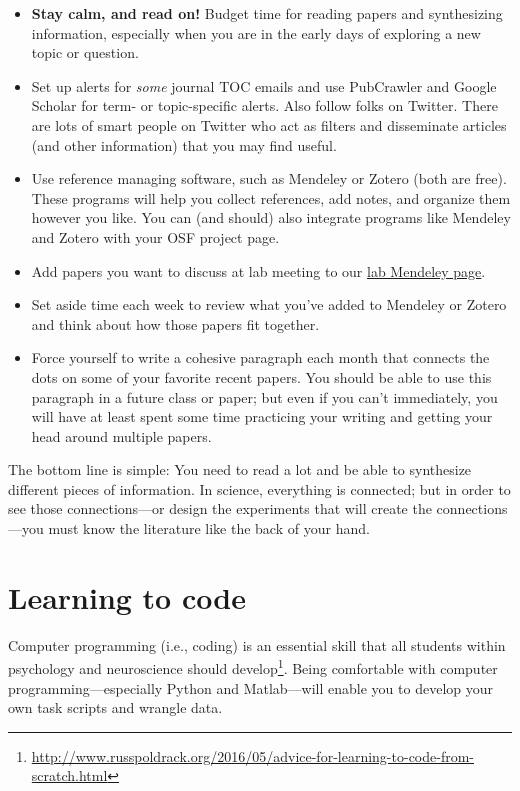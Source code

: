 \documentclass[letterpaper,12pt,oneside]{memoir}
\begin{document}
\begin{itemize}
\item \textbf{Stay calm, and read on!} Budget time for reading papers and synthesizing information, especially when you are in the early days of exploring a new topic or question. 
\item Set up alerts for \textit{some} journal TOC emails and use PubCrawler and Google Scholar for term- or topic-specific alerts. Also follow folks on Twitter. There are lots of smart people on Twitter who act as filters and disseminate articles (and other information) that you may find useful.
\item Use reference managing software, such as Mendeley or Zotero (both are free). These programs will help you collect references, add notes, and organize them however you like. You can (and should) also integrate programs like Mendeley and Zotero with your OSF project page.
\item Add papers you want to discuss at lab meeting to our \href{https://www.mendeley.com/community/smith-lab-meetings/}{lab Mendeley page}. 
\item Set aside time each week to review what you've added to Mendeley or Zotero and think about how those papers fit together.
\item Force yourself to write a cohesive paragraph each month that connects the dots on some of your favorite recent papers. You should be able to use this paragraph in a future class or paper; but even if you can't immediately, you will have at least spent some time practicing your writing and getting your head around multiple papers.
\end{itemize}

\begin{shaded}
\noindent The bottom line is simple: You need to read a lot and be able to synthesize different pieces of information. In science, everything is connected; but in order to see those connections---or design the experiments that will create the connections---you must know the literature like the back of your hand.
\end{shaded}


\section{Learning to code}
\label{sec:coding}

Computer programming (i.e., coding) is an essential skill that all students within psychology and neuroscience should develop\footnote{\url{http://www.russpoldrack.org/2016/05/advice-for-learning-to-code-from-scratch.html}}. Being comfortable with computer programming---especially Python and Matlab---will enable you to develop your own task scripts and wrangle data. 
\end{document}
